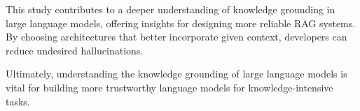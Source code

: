 % 
% 

This study contributes to a deeper understanding of knowledge grounding in large language models, offering insights for designing more reliable RAG systems.
By choosing architectures that better incorporate given context, developers can reduce undesired hallucinations.

Ultimately, understanding the knowledge grounding of large language models is vital for building more trustworthy language models for knowledge-intensive tasks.
